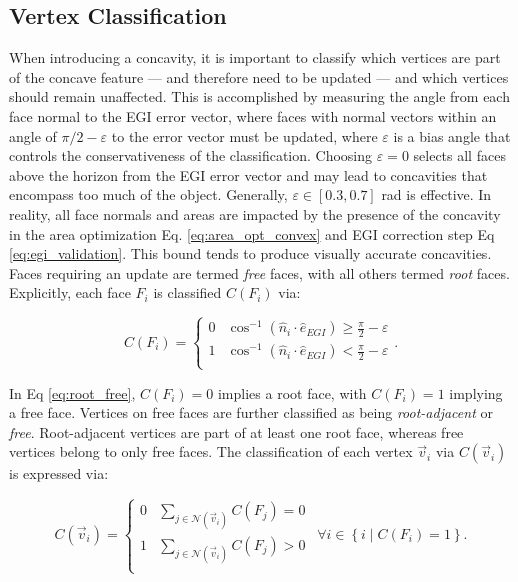\subsection{Vertex Classification}

When introducing a concavity, it is important to classify which vertices are part of the concave feature --- and therefore need to be updated --- and which vertices should remain unaffected. This is accomplished by measuring the angle from each face normal to the EGI error vector, where faces with normal vectors within an angle of $\pi/2 - \varepsilon$ to the error vector must be updated, where $\varepsilon$ is a bias angle that controls the conservativeness of the classification. Choosing $\varepsilon=0$ selects all faces above the horizon from the EGI error vector and may lead to concavities that encompass too much of the object. Generally, $\varepsilon \in [0.3, 0.7]$ rad is effective. In reality, all face normals and areas are impacted by the presence of the concavity in the area optimization Eq. \ref{eq:area_opt_convex} and EGI correction step Eq \ref{eq:egi_validation}. This bound tends to produce visually accurate concavities. Faces requiring an update are termed \textit{free} faces, with all others termed \textit{root} faces. Explicitly, each face $F_i$ is classified $C(F_i)$ via:

\begin{equation} \label{eq:root_free}
  C(F_i) = \begin{cases} 
    0 & \cos^{-1}\left( \hat{n}_i \cdot \hat{e}_{EGI} \right) \geq \frac{\pi}{2} - \varepsilon \\
    1 & \cos^{-1}\left( \hat{n}_i \cdot \hat{e}_{EGI} \right) < \frac{\pi}{2} - \varepsilon \\
  \end{cases}.
\end{equation}

In Eq \ref{eq:root_free}, $C(F_i) = 0$ implies a root face, with $C(F_i) = 1$ implying a free face. Vertices on free faces are further classified as being \textit{root-adjacent} or \textit{free}. Root-adjacent vertices are part of at least one root face, whereas free vertices belong to only free faces. The classification of each vertex $\vec{v}_i$ via $C(\vec{v}_i)$ is expressed via:

\begin{equation} \label{eq:root_free_verts}
  C(\vec{v}_i) = \begin{cases}
    0 & \sum_{j \in \mathcal{N}(\vec{v}_i)}{C(F_j)} = 0 \\
    1 & \sum_{j \in \mathcal{N}(\vec{v}_i)}{C(F_j)} > 0 \\    
  \end{cases} \: \: \forall i \in \left\{ i \mid C(F_i) = 1 \right\}.
\end{equation}

